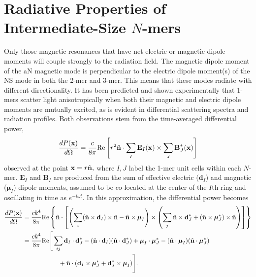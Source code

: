 \documentclass[journal=apchd5,manuscript=article]{achemso}
\begin{document}
\section{Radiative Properties of Intermediate-Size $N$-mers}
Only those magnetic resonances that have net electric or magnetic dipole moments will couple strongly to the radiation field. The magnetic dipole moment of the aN magnetic mode is perpendicular to the electric dipole moment(s) of the NS mode in both the 2-mer and 3-mer. This means that these modes radiate with different directionality. It has been predicted and shown experimentally that 1-mers scatter light anisotropically when both their magnetic and electric dipole moments are mutually excited, \cite{Dionne2011,Cherqui2016} as is evident in differential scattering spectra and radiation profiles. Both observations stem from the time-averaged differential power, \cite{jackson_classical_1999,schwinger1998classical}
\begin{equation}
\frac{dP({\bf x})}{d\Omega} = \frac{c}{8\pi}\textrm{Re}\left[r^2\hat{\textbf{n}}\cdot\sum_I\textbf{E}_I({\bf x}) \times \sum_{J}\textbf{B}_{J}^*({\bf x})\right]
\label{dp_field_1}
\end{equation}
observed at the point ${\bf x}=r\hat{\bf n},$ where $I,J$ label the 1-mer unit cells within each $N$-mer. $\textbf{E}_I$ and $\textbf{B}_I$ are produced from the sum of effective electric ($\textbf{d}_I$) and magnetic ($\boldsymbol{\mu}_I$) dipole moments, assumed to be co-located at the center of the $I$th ring and oscillating in time as $e^{-i\omega t}$. In this approximation, the differential power becomes \cite{Alu2006}
\begin{equation}
\begin{split}
\frac{dP({\bf x})}{d\Omega} &= \frac{ck^4}{8\pi} \textrm{Re} \left\{\hat{\textbf{n}} \cdot \left[\left(\sum_{i} (\hat{\textbf{n}} \times \textbf{d}_I) \times \hat{\textbf{n}} - \hat{\textbf{n}} \times \boldsymbol{\mu}_I\right) \times \left(\sum_{j} \hat{\textbf{n}} \times \textbf{d}_J^* + (\hat{\textbf{n}} \times \boldsymbol{\mu}_J^*) \times \hat{\textbf{n}}\right)\right]\right\}\\
&= \frac{ck^4}{8\pi} \textrm{Re} \Bigg[ \sum_{ij} \textbf{d}_I \cdot \textbf{d}_J^* - (\hat{\textbf{n}} \cdot \textbf{d}_I)(\hat{\textbf{n}} \cdot \textbf{d}_J^*) + \boldsymbol{\mu}_I \cdot \boldsymbol{\mu}_J^* - (\hat{\textbf{n}} \cdot \boldsymbol{\mu}_I)(\hat{\textbf{n}} \cdot \boldsymbol{\mu}_J^*) \\ 
&\hspace{2cm}+ \hat{\textbf{n}} \cdot (\textbf{d}_I \times \boldsymbol{\mu}_J^* + \textbf{d}_J^* \times \boldsymbol{\mu}_I) \Bigg].
\label{dp_dipoles_1}
\end{split}
\end{equation}
\end{document}
